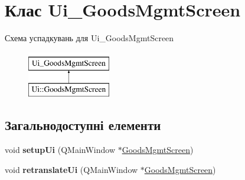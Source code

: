 \hypertarget{classUi__GoodsMgmtScreen}{\section{Клас Ui\-\_\-\-Goods\-Mgmt\-Screen}
\label{classUi__GoodsMgmtScreen}
}
Схема успадкувань для Ui\-\_\-\-Goods\-Mgmt\-Screen\begin{figure}[H]
\begin{center}
\leavevmode
\includegraphics[height=2.000000cm]{classUi__GoodsMgmtScreen}
\end{center}
\end{figure}
\subsection*{Загальнодоступні елементи}
\begin{DoxyCompactItemize}
\item 
\hypertarget{classUi__GoodsMgmtScreen_a8baf991b8f140c374f26406651bf3244}{void {\bfseries setup\-Ui} (Q\-Main\-Window $\ast$\hyperlink{classGoodsMgmtScreen}{Goods\-Mgmt\-Screen})}\label{classUi__GoodsMgmtScreen_a8baf991b8f140c374f26406651bf3244}

\item 
\hypertarget{classUi__GoodsMgmtScreen_a0cfda36456b30c0be0117295991c9a46}{void {\bfseries retranslate\-Ui} (Q\-Main\-Window $\ast$\hyperlink{classGoodsMgmtScreen}{Goods\-Mgmt\-Screen})}\label{classUi__GoodsMgmtScreen_a0cfda36456b30c0be0117295991c9a46}

\end{DoxyCompactItemize}
